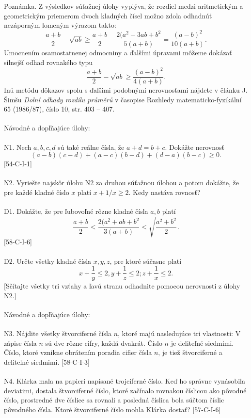 Poznámka. Z výsledkov súťažnej úlohy vyplýva, že rozdiel medzi aritmetickým a geometrickým priemerom dvoch kladných čísel možno zdola odhadnúť nezáporným lomeným výrazom takto:
$$\frac{a+b}{2}- \sqrt{ab}\geq\frac{a+b}{2}-\frac{2(a^2+3ab+b^2}{5(a+b)}=\frac{(a-b)^2}{10(a+b)}.$$
Umocnením osamostatnenej odmocniny a ďalšími úpravami môžeme dokázať silnejší odhad rovnakého typu
$$\frac{a+b}{2}- \sqrt{ab}\geq\frac{(a-b)^2}{4(a+b)}.$$
Inú metódu dôkazov spolu s ďalšími podobnými nerovnosťami nájdete v článku J. Šimšu \textit{Dolní odhady rozdílu průměrů} v časopise Rozhledy matematicko-fyzikální 65 (1986/87), číslo 10, str. 403 -- 407.\\
\\
Návodné a dopľňajúce úlohy:\\
\\
N1. Nech $a, b, c, d$ sú také reálne čísla, že $a + d = b + c$. Dokážte nerovnosť $$(a -b)(c- d) + (a- c)(b-  d) + (d-a)(b-c)\geq 0.$$
[54-C-I-1]\\
\\
N2. Vyriešte najskôr úlohu N2 za druhou súťažnou úlohou a potom dokážte, že pre každé kladné číslo $x$ platí $x + 1/x \geq 2$. Kedy nastáva rovnosť?\\
\\
D1. Dokážte, že pre ľubovoľné rôzne kladné čísla $a, b$ platí
$$ \frac{a+b}{2}< \frac{2(a^2+ab+b^2}{3(a+b)}<\sqrt{\frac{a^2+b^2}{2}}.$$
[58-C-I-6]\\
\\
D2. Určte všetky kladné čísla $x, y, z$, pre ktoré súčasne platí
$$x +\frac{1}{y}\leq 2,  y+\frac{1}{z} \leq 2; z +\frac{1}{x} \leq 2.$$
[Sčítajte všetky tri vzťahy a ľavú stranu odhadnite pomocou nerovnosti z úlohy N2.]\\
\\

Návodné a dopľňajúce úlohy:\\
\\
N3. Nájdite všetky štvorciferné čísla $n$, ktoré majú nasledujúce tri vlastnosti: V zápise čísla $n$ sú dve rôzne cifry, každá dvakrát. Číslo $n$ je deliteľné siedmimi. Číslo, ktoré vznikne obrátením poradia cifier čísla $n$, je tiež štvorciferné a deliteľné siedmimi. [58-C-I-3]\\
\\
N4. Klárka mala na papieri napísané trojciferné číslo. Keď ho správne vynásobila deviatimi, dostala štvorciferné číslo, ktoré začínalo rovnakou číslicou ako pôvodné číslo, prostredné dve číslice sa rovnali a posledná číslica bola súčtom číslic pôvodného čísla.
Ktoré štvorciferné číslo mohla Klárka dostať? [57-C-I-6]\\
\\

